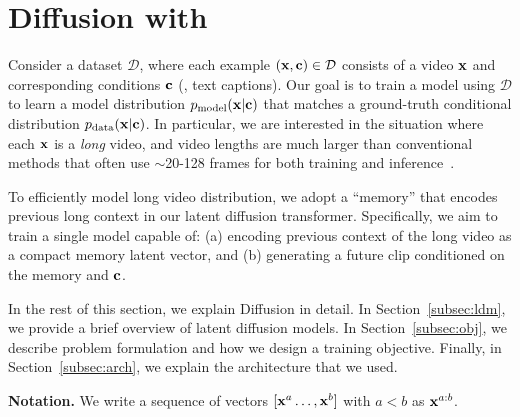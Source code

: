 \section{\sname Diffusion with \lname}
\label{sec:method}
Consider a dataset $\mathcal{D}$, where each example $(\mathbf{x}, \mathbf{c}) \in \mathcal{D}$ consists of a video $\mathbf{x}$ and corresponding conditions $\mathbf{c}$ (\eg, text captions). Our goal is to train a model using $\mathcal{D}$ to learn a model distribution $p_{\text{model}}(\mathbf{x} | \mathbf{c})$ that matches a ground-truth conditional distribution $p_{\text{data}} (\mathbf{x} | \mathbf{c})$. In particular, we are interested in the situation where each $\mathbf{x}$ is a \emph{long} video, and video lengths are much larger than conventional methods that often use $\sim$20-128 frames for both training and inference~\citep{he2022lvdm}.

To efficiently model long video distribution, we adopt a ``memory'' that encodes previous long context in our latent diffusion transformer. Specifically, we aim to train a single model capable of: (a) encoding previous context of the long video as a compact memory latent vector, and (b) generating a future clip conditioned on the memory and $\mathbf{c}$. 

In the rest of this section, we explain \sname Diffusion in detail. In Section~\ref{subsec:ldm}, we provide a brief overview of latent diffusion models. In Section~\ref{subsec:obj}, we describe problem formulation and how we design a training objective. Finally, in Section~\ref{subsec:arch}, we explain the architecture that we used.

\vspace{0.02in}
\noindent\textbf{Notation.}
We write a sequence of vectors $[\mathbf{x}^{a} \ldots, \mathbf{x}^{b}]$ with $a<b$ as $\mathbf{x}^{a:b}$. 

